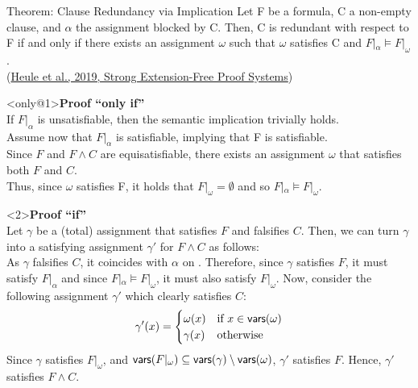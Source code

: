 \documentclass[t]{sdqbeamer}
\begin{document}
\begin{frame}{Theorem: Clause Redundancy via Implication}
\vspace*{-2ex}
Let F be a formula, C a non-empty clause, and $\alpha$ the assignment blocked by C. Then, C is redundant with respect to F if and only if there exists an assignment $\omega$ such that $\omega$ satisfies C and $F|_\alpha \models F|_\omega$.\\
\hfill(\href{https://doi.org/10.1007/s10817-019-09516-0}{Heule et al., 2019, Strong Extension-Free Proof Systems})

\begin{block}<only@1>{\textbf{Proof ``only if''}}
 \\[1ex]
If $F|_\alpha$ is unsatisfiable, then the semantic implication trivially holds.\\[1ex]
Assume now that $F|_\alpha$ is satisfiable, implying that F is satisfiable.\\
Since $F$ and $F \land C$ are equisatisfiable, there exists an assignment $\omega$ that satisfies both $F$ and $C$.\\
Thus, since $\omega$ satisfies F, it holds that $F|_\omega = \emptyset$ and so $F|_\alpha \models F|_\omega$.
\end{block}

\begin{block}<2>{\textbf{Proof ``if''}}
 \\[1ex]
Let $\gamma$ be a (total) assignment that satisfies $F$ and falsifies $C$. Then, we can turn $\gamma$ into a satisfying assignment $\gamma'$ for $F \land C$ as follows:\\
As $\gamma$ falsifies $C$, it coincides with $\alpha$ on . Therefore, since $\gamma$ satisfies $F$, it must satisfy $F|_\alpha$ and since $F|_\alpha \models F|_\omega$, it must also satisfy $F|_\omega$.
Now, consider the following assignment $\gamma'$ which clearly satisfies $C$:
$$
\gamma'(x) = \begin{cases} 
    \omega(x) & \text{if } x \in \textsf{vars} (\omega)\\ 
    \gamma(x) & \text{otherwise}
\end{cases}
$$
Since $\gamma$ satisfies $F|_\omega$, and $\textsf{vars} (F|_\omega) \subseteq \textsf{vars} (\gamma) \setminus \textsf{vars} (\omega)$, $\gamma'$ satisfies $F$.
Hence, $\gamma'$ satisfies $F \land C$.
\end{block}
\end{frame}
\end{document}
